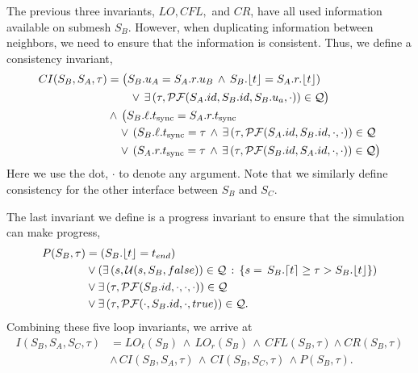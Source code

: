 The previous three invariants, $LO, CFL,$ and $CR$, have all used information available on submesh $S_B$. However, when duplicating information between neighbors, we need to ensure that the information is consistent. Thus, we define a consistency invariant,
\begin{align}
CI(S_B, S_A, \tau) &= \big( S_B.u_A = S_A.r.u_B \,\land\, S_B.\lfloor t \rfloor = S_A.r.\lfloor t \rfloor)\label{eq:CI1}\\
&\quad\quad \lor\, \exists\,(\tau,\mathcal{PF}(S_A.id, S_B.id, S_B.u_a, \cdot))
\in\mathcal{Q} \big)\label{eq:CI2}\\
&\land\,\big( S_B.\ell.t_{\text{sync}} = S_A.r.t_{\text{sync}}\label{eq:CI3}\\
&\quad \lor\, ( S_B.\ell.t_{\text{sync}} = \tau \,\land\,\exists\,(\tau,\mathcal{PF}(S_A.id,S_B.id,\cdot,\cdot))\in \mathcal{Q}\label{eq:CI4}\\
&\quad\lor\, (S_A.r.t_{\text{sync}}=\tau \,\land\,\exists\,(\tau,\mathcal{PF}(S_B.id,S_A.id, \cdot, \cdot)) \in \mathcal{Q} \big)\label{eq:CI5}
\end{align}
Here we use the dot, $\cdot$ to denote any argument. Note that we similarly define consistency for the other interface between $S_B$ and $S_C$.

The last invariant we define is a progress invariant to ensure that the simulation can make progress,
\begin{align}
P(S_B, \tau) &= (S_B.\lfloor t \rfloor = t_{end})\\
&\lor  (\exists\,(s,\mathcal{U}(s,S_B,false))\in\mathcal{Q} \, :\, \{s = \,S_B.\lceil t \rceil \ge \tau > S_B.\lfloor t \rfloor\})\label{eq:P2}\\
&\lor  \exists\,(\tau, \mathcal{PF}(S_B.id, \cdot, \cdot,\cdot))\in \mathcal{Q} \label{eq:P3} \\
&\lor  \exists\,(\tau, \mathcal{PF}(\cdot, S_B.id, \cdot, true))\in\mathcal{Q}. \label{eq:P4}
\end{align}
Combining these five loop invariants, we arrive at
\begin{align}
I(S_B, S_A, S_C, \tau) &= LO_{\ell}(S_B) \,\land\, LO_r(S_B) \,\land\,CFL(S_B, \tau) \land CR(S_B, \tau)\\
&\land\,CI(S_B,S_A, \tau) \,\land\, CI(S_B,S_C,\tau)\,\land P(S_B,\tau).
\end{align}

